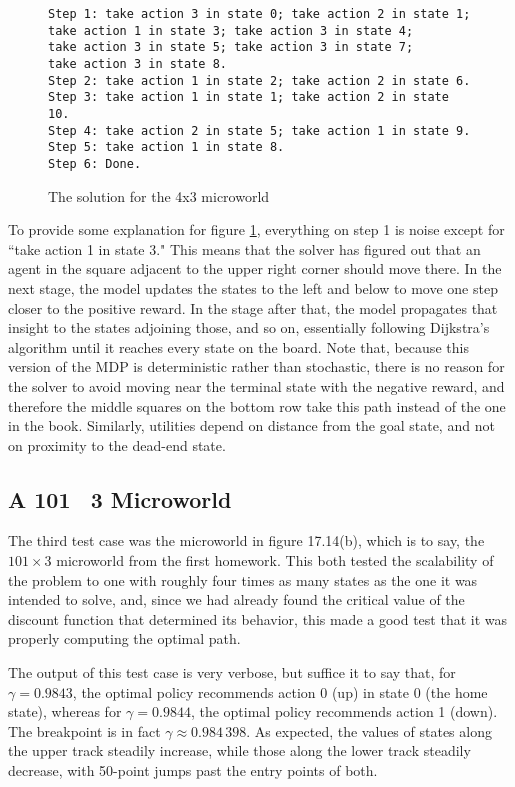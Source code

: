 \documentclass[paper=letter,pagesize=automedia,twoside=false,12pt]{scrartcl}
\theoremstyle{plain}%
\theoremstyle{definition}
\theoremstyle{remark}
\begin{document}
\begin{figure}[h!]\label{fig:sol-test4x3}
\caption{The solution for the 4x3 microworld}
\begin{verbatim}
Step 1: take action 3 in state 0; take action 2 in state 1;
take action 1 in state 3; take action 3 in state 4;
take action 3 in state 5; take action 3 in state 7;
take action 3 in state 8.
Step 2: take action 1 in state 2; take action 2 in state 6.
Step 3: take action 1 in state 1; take action 2 in state 10.
Step 4: take action 2 in state 5; take action 1 in state 9.
Step 5: take action 1 in state 8.
Step 6: Done.
\end{verbatim}
\end{figure}

To provide some explanation for figure \ref{fig:sol-test4x3}, everything on step 1 is noise except for ``take action 1 in state 3."  This means that the solver has figured out that an agent in the square adjacent to the upper right corner should move there.  In the next stage, the model updates the states to the left and below to move one step closer to the positive reward.  In the stage after that, the model propagates that insight to the states adjoining those, and so on, essentially following Dijkstra's algorithm until it reaches every state on the board.  Note that, because this version of the MDP is deterministic rather than stochastic, there is no reason for the solver to avoid moving near the terminal state with the negative reward, and therefore the middle squares on the bottom row take this path instead of the one in the book.  Similarly, utilities depend on distance from the goal state, and not on proximity to the dead-end state.

\subsection{A 101 \times~3 Microworld}\label{sec:test101}

The third test case was the microworld in figure 17.14(b), which is to say, the \(101 \times 3\) microworld from the first homework.  This both tested the scalability of the problem to one with roughly four times as many states as the one it was intended to solve, and, since we had already found the critical value of the discount function that determined its behavior, this made a good test that it was properly computing the optimal path.

The output of this test case is very verbose, but suffice it to say that, for \(\gamma = 0.9843\), the optimal policy recommends action 0 (up) in state 0 (the home state), whereas for \(\gamma = 0.9844\), the optimal policy recommends action 1 (down).  The breakpoint is in fact \(\gamma \approx 0.984\,398\).  As expected, the values of states along the upper track steadily increase, while those along the lower track steadily decrease, with 50-point jumps past the entry points of both.
\end{document}
